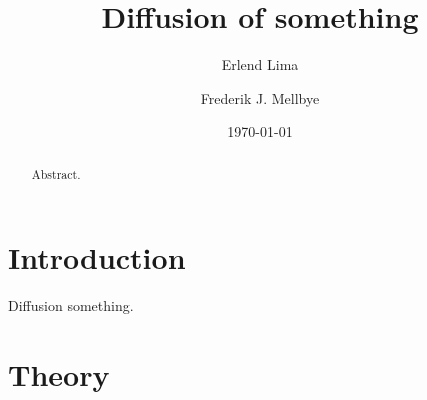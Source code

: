 \documentclass[aps,reprint]{revtex4-1}
\begin{document}
\title{Diffusion of something}
\author{Erlend Lima}
\author{Frederik J. Mellbye}
\date{\today}

\begin{abstract}
Abstract.
\end{abstract}
\maketitle
\tableofcontents
\makeatletter
\let\toc@pre\relax
\let\toc@post\relax
\makeatother

\newpage

\section{Introduction} \label{sec:introduction}
Diffusion something.
\section{Theory} \label{sec:theory}
\end{document}
